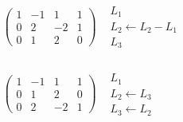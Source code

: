 \documentclass[11pt, fleqn]{report}
\begin{document}
\noindent $
\begin{array}{cc}
	\left(\begin{array}{cccc}
		1 & -1 & 1 & 1 \\
		0 & 2 & -2 & 1 \\
		0 & 1 & 2 & 0
	\end{array}\right)
	& \begin{array}{l}
	L_1\\
	L_2 \leftarrow L_2-L_1\\
	L_3
	\end{array}
\end{array}	 $
\\
\\

\noindent $
\begin{array}{cc}
	\left(\begin{array}{cccc}
		1 & -1 & 1 & 1 \\
		0 & 1 & 2 & 0 \\
		0 & 2 & -2 & 1
	\end{array}\right)
	& \begin{array}{l}
	L_1\\
	L_2 \leftarrow L_3\\
	L_3 \leftarrow L_2
	\end{array}
\end{array}	 $
\\
\\
\end{document}
